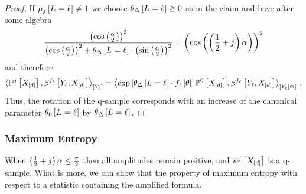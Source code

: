 \begin{proof}
    If $\mu_{j}\left[L_{}=\ell_{}\right]\neq 1$ we choose $\theta_{\Delta}\left[L_{}=\ell_{}\right]\geq 0$ as in the claim and have after some algebra
    \begin{align*}
        \frac{
            \left(\mathrm{cos}\left(\frac{\alpha}{2}\right)\right)^2
        }{
            \left(\mathrm{cos}\left(\frac{\alpha}{2}\right)\right)^2 + \theta_{\Delta}\left[L_{}=\ell_{}\right] \cdot \left(\mathrm{sin}\left(\frac{\alpha}{2}\right)\right)^2
        } = \left(\mathrm{cos}\left(\left(\frac{1}{2}+j\right)\alpha\right)\right)^2
    \end{align*}
    and therefore
    \begin{align*}
        \contractionof{\probofat{\repnum}{\shortcatvariables},\bencodingofat{\formulaof{\selindex}}{\headvariableof{\selindex},\shortcatvariables}}{\headvariableof{\selindex}}
        = \normalizationof{
            \expof{\canparamofat{\Delta}{\indexedselvariable}\cdot\formulaofat{\selindex}{\canparam}}
            \probofat{0}{\shortcatvariables},\bencodingofat{\formulaof{\selindex}}{\headvariableof{\selindex},\shortcatvariables}
        }{\headvariableof{\selindex}} \, .
    \end{align*}
    Thus, the rotation of the q-sample corresponds with an increase of the canonical parameter $\theta_{0}\left[L_{}=\ell_{}\right]$ by $\theta_{\Delta}\left[L_{}=\ell_{}\right]$.
\end{proof}

\subsubsection{Maximum Entropy}

When $\left(\frac{1}{2}+j\right)\alpha\leq \frac{\pi}{2}$ then all amplitudes remain positive, and $\psi^{j}\left[X_{[d]}\right]$ is a q-sample.
What is more, we can show that the property of maximum entropy with respect to a statistic containing the amplified formula.

